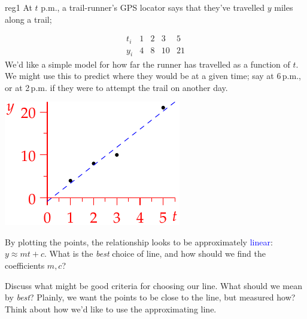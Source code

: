 \begin{example}{}{reg1}
At $t$ p.m., a trail-runner's GPS locator says that they've travelled $y$ miles along a trail;\par
\begin{minipage}[t]{0.64\linewidth}\vspace{-11pt}
\[\begin{array}{c|ccccc}
t_i&1&2&3&5\\\hline
y_i&4&8&10&21
\end{array}\]
We'd like a simple model for how far the runner has travelled as a function of $t$. We might use this to predict where they would be at a given time; say at 6\,p.m., or at 2\,p.m.{} if they were to attempt the trail on another day.
\end{minipage}\hfill\begin{minipage}[t]{0.35\linewidth}\vspace{-3pt}
\flushright\includegraphics{reg-line}
\end{minipage}
\smallbreak
By plotting the points, the relationship looks to be approximately\footnotemark{} \textcolor{blue}{linear}: $y\approx mt+c$. What is the \emph{best} choice of line, and how should we find the coefficients $m,c$?\medbreak

Discuss what might be good criteria for choosing our line. What should we mean by \emph{best}? Plainly, we want the points to be close to the line, but measured how? Think about how we'd like to use the approximating line.\smallbreak


\end{example}
